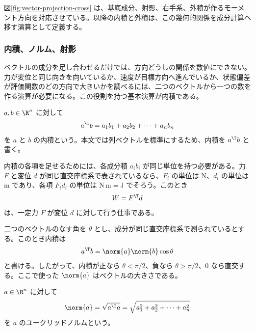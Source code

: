 図\ref{fig:vector-projection-cross} は、基底成分、射影、右手系、外積が作るモーメント方向を対応させている。以降の内積と外積は、この幾何的関係を成分計算へ移す演算として定義する。

\subsubsection{内積、ノルム、射影}

ベクトルの成分を足し合わせるだけでは、方向どうしの関係を数値にできない。力が変位と同じ向きを向いているか、速度が目標方向へ進んでいるか、状態偏差が評価関数のどの方向で大きいかを調べるには、二つのベクトルから一つの数を作る演算が必要になる。この役割を持つ基本演算が内積である。

\begin{definition}[内積]
$a,b\in\R^n$ に対して
\begin{equation}
  a^\T b
  =
  a_1b_1+a_2b_2+\cdots+a_nb_n
\end{equation}
を $a$ と $b$ の内積という。本文では列ベクトルを標準にするため、内積を $a^\T b$ と書く。
\end{definition}

内積の各項を足せるためには、各成分積 $a_i b_i$ が同じ単位を持つ必要がある。力 $F$ と変位 $d$ が同じ直交座標系で表されているなら、$F_i$ の単位は N、$d_i$ の単位は m であり、各項 $F_i d_i$ の単位は $\mathrm{N\,m}=\mathrm{J}$ でそろう。このとき
\begin{equation}
  W=F^\T d
\end{equation}
は、一定力 $F$ が変位 $d$ に対して行う仕事である。

二つのベクトルのなす角を $\theta$ とし、成分が同じ直交座標系で測られているとする。このとき内積は
\begin{equation}
  a^\T b=\norm{a}\norm{b}\cos\theta
\end{equation}
と書ける。したがって、内積が正なら $\theta<\pi/2$、負なら $\theta>\pi/2$、0 なら直交する。ここで使った $\norm{a}$ はベクトルの大きさである。

\begin{definition}[ユークリッドノルム]
$a\in\R^n$ に対して
\begin{equation}
  \norm{a}
  =
  \sqrt{a^\T a}
  =
  \sqrt{a_1^2+a_2^2+\cdots+a_n^2}
\end{equation}
を $a$ のユークリッドノルムという。
\end{definition}

